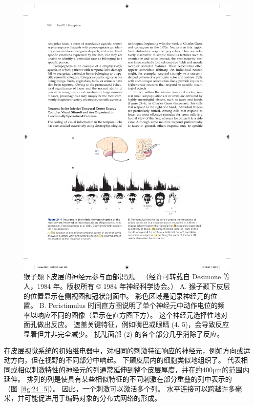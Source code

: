 \begin{figure}[htbp]
	\centering
	\includegraphics[width=0.7\linewidth]{chap24/fig_24_4}
	\caption{猴子颞下皮层的神经元参与面部识别。 （经许可转载自 Desimone 等人，1984 年。版权所有 © 1984 年神经科学协会。） 
		A. 猴子颞下皮层的位置显示在侧视图和冠状剖面中。 彩色区域是记录神经元的位置。 
		B. Peristimulus 时间直方图说明了单个神经元中动作电位的频率以响应不同的图像（显示在直方图下方）。
		这个神经元选择性地对面孔做出反应。
		遮盖关键特征，例如嘴巴或眼睛 (4, 5)，会导致反应显着但并非完全减少。
		扰乱面部 (2) 的各个部分几乎消除了反应。}
	\label{fig:24_4}
\end{figure}


在皮层视觉系统的初始继电器中，对相同的刺激特征响应的神经元，例如方向或运动方向，但在视野的不同部分中响起。
下颞皮层内的细胞类似地组织了。
代表相同或相似刺激特性的神经元的列通常延伸到整个皮层厚度，并在约400μm的范围内延伸。
排列的列是使具有某些相似特征的不同刺激在部分重叠的列中表示的（图~\ref{fig:24_5}）。
因此，一个刺激可以激活多个列。
水平连接可以跨越许多毫米，并可能促进用于编码对象的分布式网络的形成。


